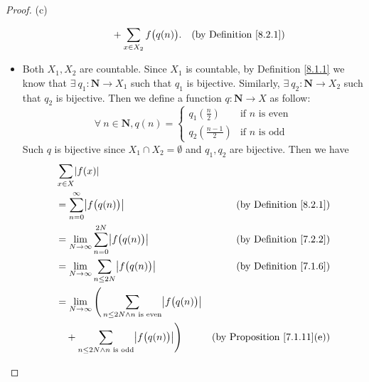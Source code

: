 \begin{proof}{(c)}
\begin{itemize}
\begin{align*}
                                      & \quad + \sum_{x \in X_2} f\big(q(n)\big).                                                & \text{(by Definition \ref{8.2.1})}
              \end{align*}
        \item Both \(X_1, X_2\) are countable.
              Since \(X_1\) is countable, by Definition \ref{8.1.1} we know that \(\exists\ q_1 : \mathbf{N} \to X_1\) such that \(q_1\) is bijective.
              Similarly, \(\exists\ q_2 : \mathbf{N} \to X_2\) such that \(q_2\) is bijective.
              Then we define a function \(q : \mathbf{N} \to X\) as follow:
              \[
                  \forall\ n \in \mathbf{N}, q(n) = \begin{cases}
                      q_1(\frac{n}{2})     & \text{if } n \text{ is even} \\
                      q_2(\frac{n - 1}{2}) & \text{if } n \text{ is odd}
                  \end{cases}
              \]
              Such \(q\) is bijective since \(X_1 \cap X_2 = \emptyset\) and \(q_1, q_2\) are bijective.
              Then we have
              \begin{align*}
                   & \sum_{x \in X} \abs*{f(x)}                                                                                                                                            \\
                   & = \sum_{n = 0}^\infty \abs*{f\big(q(n)\big)}                                                                                & \text{(by Definition \ref{8.2.1})}      \\
                   & = \lim_{N \to \infty} \sum_{n = 0}^{2N} \abs*{f\big(q(n)\big)}                                                              & \text{(by Definition \ref{7.2.2})}      \\
                   & = \lim_{N \to \infty} \sum_{n \leq 2N} \abs*{f\big(q(n)\big)}                                                               & \text{(by Definition \ref{7.1.6})}      \\
                   & = \lim_{N \to \infty} \Bigg(\sum_{n \leq 2N \land n \text{ is even}} \abs*{f\big(q(n)\big)}                                                                           \\
                   & \quad + \sum_{n \leq 2N \land n \text{ is odd}} \abs*{f\big(q(n)\big)}\Bigg)                                                & \text{(by Proposition \ref{7.1.11}(e))} \\

\end{align*}
\end{itemize}
\end{proof}
